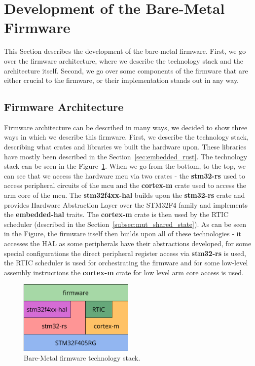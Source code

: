 \section{Development of the Bare-Metal Firmware}
\label{sec:firmware}
This Section describes the development of the bare-metal firmware.
First, we go over the firmware architecture, where we describe the technology stack and the architecture itself.
Second, we go over some components of the firmware that are either crucial to the firmware, or their implementation stands out in any way.

\subsection{Firmware Architecture}
\label{subsec:firmware-arch}
Firmware architecture can be described in many ways, we decided to show three ways in which we describe this firmware.
First, we describe the technology stack, describing what crates and libraries we built the hardware upon.
These libraries have mostly been described in the Section~\ref{sec:embedded_rust}.
The technology stack can be seen in the Figure~\ref{fig:firmware_tech_stack}.
When we go from the bottom, to the top, we can see that we access the hardware \acs{mcu} via two crates - the \textbf{stm32-rs} used to access peripheral circuits of the \acs{mcu} and the \textbf{cortex-m} crate used to access the \acs{arm} core of the \acs{mcu}.
The \textbf{stm32f4xx-hal} builds upon the \textbf{stm32-rs} crate and provides Hardware Abstraction Layer over the STM32F4 family and implements the \textbf{embedded-hal} traits.
The \textbf{cortex-m} crate is then used by the RTIC scheduler (described in the Section~\ref{subsec:mut_shared_state}).
As can be seen in the Figure, the firmware itself then builds upon all of these technologies - it accesses the HAL as some peripherals have their abstractions developed, for some special configurations the direct peripheral register access via \textbf{stm32-rs} is used, the RTIC scheduler is used for orchestrating the firmware and for some low-level assembly instructions the \textbf{cortex-m} crate for low level \acs{arm} core access is used.

\begin{figure}[H]
    \centering
    \includegraphics[width=0.5\textwidth]{obrazky/tech_stack}
    \caption{Bare-Metal firmware technology stack.}
    \label{fig:firmware_tech_stack}
\end{figure}

